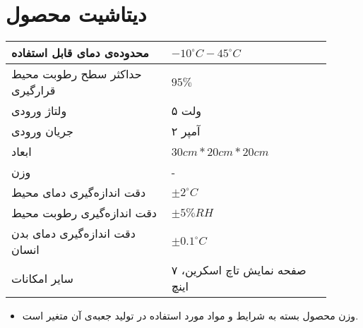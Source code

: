 \chapter{دیتاشیت محصول}



\begin{table}[ht!]
	\begin{tabular}{|p{0.45\linewidth}|p{0.45\linewidth}|}
		\hline		
				محدوده‌ی دمای قابل استفاده
		&    $-10 ^\circ C - 45 ^\circ C$
		\\ \hline
		حداکثر سطح رطوبت محیط قرارگیری 
		&   
		$		95\%$		
		\\ \hline
		ولتاژ ورودی
		&   
	۵ ولت	
		\\ \hline
		جریان ورودی
		&   
۲ آمپر
		\\ \hline
		ابعاد
		&   
$30cm * 20cm * 20cm$
		\\ \hline
		وزن
		&   
- 
		\\ \hline
		دقت اندازه‌گیری دمای محیط     &
		$\pm2 ^\circ C$
		 \\ \hline
		دقت اندازه‌گیری رطوبت محیط &   
				$\pm5\%RH$
		 \\ \hline
		 دقت اندازه‌گیری دمای بدن انسان
&
$ \pm 0.1 ^\circ C$
		 \\ \hline	 
سایر امکانات
		 &
صفحه نمایش تاچ اسکرین، ۷ اینچ
		 \\ \hline
	\end{tabular}
\end{table}

\begin{itemize}
	\item 
وزن محصول بسته به شرایط و مواد مورد استفاده در تولید جعبه‌ی آن متغیر است.

\end{itemize}